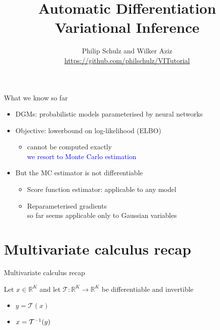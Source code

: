 \documentclass[14pt,dvipsnames]{beamer}
\title{Automatic Differentiation Variational Inference}
\author{Philip Schulz and Wilker Aziz\\
\url{https://github.com/philschulz/VITutorial}}
\date{}
\begin{document}
\begin{frame}
\maketitle
\end{frame}

\begin{frame}{What we know so far}
    \begin{itemize}
        \item DGMs: \pause probabilistic models parameterised by neural networks \pause
        \item Objective: \pause lowerbound on log-likelihood (ELBO) \pause
        \begin{itemize}
        		\item \alert{cannot be computed exactly} \\ \pause
        		\textcolor{blue}{we resort to Monte Carlo estimation} \pause		
	\end{itemize}
	\item \alert{But the MC estimator is not differentiable} \pause		        
	\begin{itemize}
       		\item Score function estimator: applicable to any model  \pause
		\item Reparameterised gradients\\
		so far seems applicable only to Gaussian variables
        \end{itemize}
    \end{itemize}
    
\end{frame}



\section{Multivariate calculus recap}

\begin{frame}{Multivariate calculus recap}

Let $x \in \mathbb R^K$ and let $\mathcal T: \mathbb R^K \to \mathbb R^K$ be differentiable and invertible
\begin{itemize}
	\item $y = \mathcal T(x)$
	\item $x = {\mathcal T}^{-1}(y)$
\end{itemize}

\end{frame}
\end{document}
